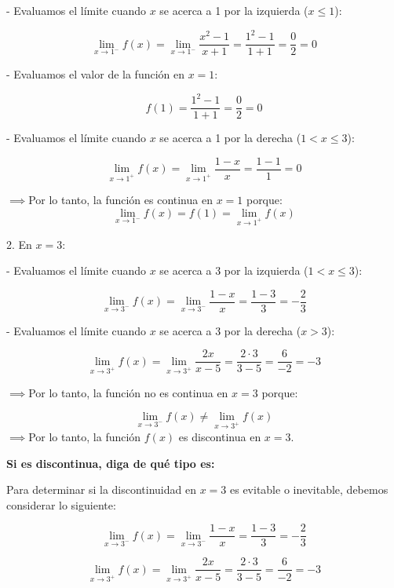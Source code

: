 \documentclass[answers]{exam} %
\begin{document}
\begin{questions}
\begin{solution}
		- Evaluamos el límite cuando \( x \) se acerca a 1 por la izquierda (\( x \leq 1 \)):

		\[
			\lim_{{x \to 1^-}} f(x) = \lim_{{x \to 1^-}} \frac{x^2 - 1}{x+1} = \frac{1^2 - 1}{1+1} = \frac{0}{2} = 0
		\]

		- Evaluamos el valor de la función en \( x = 1 \):

		\[
			f(1) = \frac{1^2 - 1}{1+1} = \frac{0}{2} = 0
		\]

		- Evaluamos el límite cuando \( x \) se acerca a 1 por la derecha (\( 1 < x \leq 3 \)):

		\[
			\lim_{{x \to 1^+}} f(x) = \lim_{{x \to 1^+}} \frac{1 - x}{x} = \frac{1 - 1}{1} = 0
		\]

		$\implies$Por lo tanto, la función es continua en \( x = 1 \)  porque:
		\[
			\lim_{{x \to 1^-}} f(x) = f(1) = \lim_{{x \to 1^+}} f(x)
		\]

		2. En \( x = 3 \):

		- Evaluamos el límite cuando \( x \) se acerca a 3 por la izquierda (\( 1 < x \leq 3 \)):

		\[
			\lim_{{x \to 3^-}} f(x) = \lim_{{x \to 3^-}} \frac{1 - x}{x} = \frac{1 - 3}{3} = -\frac{2}{3}
		\]

		- Evaluamos el límite cuando \( x \) se acerca a 3 por la derecha (\( x > 3 \)):

		\[
			\lim_{{x \to 3^+}} f(x) = \lim_{{x \to 3^+}} \frac{2x}{x-5} = \frac{2 \cdot 3}{3 - 5} = \frac{6}{-2} = -3
		\]

		$\implies$Por lo tanto, la función no es continua en \( x = 3 \)  porque:

		\[
			\lim_{{x \to 3^-}} f(x) \neq \lim_{{x \to 3^+}} f(x)
		\]
		$\implies$Por lo tanto, la función \( f(x) \) es discontinua en \( x = 3 \).
	\end{solution}


	\vspace{0.5cm}

	\question \large\textbf{Si es discontinua, diga de qué tipo es:}
	\begin{solution}
		Para determinar si la discontinuidad en \( x = 3 \) es evitable o inevitable, debemos considerar lo siguiente:


		\[
			\lim_{{x \to 3^-}} f(x) = \lim_{{x \to 3^-}} \frac{1 - x}{x} = \frac{1 - 3}{3} = -\frac{2}{3}
		\]


		\[
			\lim_{{x \to 3^+}} f(x) = \lim_{{x \to 3^+}} \frac{2x}{x-5} = \frac{2 \cdot 3}{3 - 5} = \frac{6}{-2} = -3
		\]


\end{solution}
\end{questions}
\end{document}
